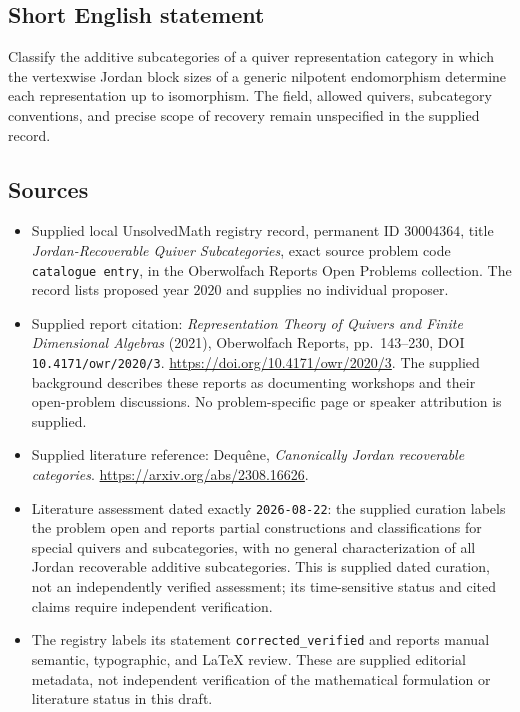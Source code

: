 \documentclass[11pt]{article}
\begin{document}
\subsection{Short English statement}
Classify the additive subcategories of a quiver representation category in which the vertexwise Jordan block sizes of a generic nilpotent endomorphism determine each representation up to isomorphism. The field, allowed quivers, subcategory conventions, and precise scope of recovery remain unspecified in the supplied record.
\subsection{Sources}
\begin{itemize}
\item Supplied local UnsolvedMath registry record, permanent ID \(30004364\), title \emph{Jordan-Recoverable Quiver Subcategories}, exact source problem code \texttt{catalogue entry}, in the Oberwolfach Reports Open Problems collection. The record lists proposed year \(2020\) and supplies no individual proposer.
\item Supplied report citation: \emph{Representation Theory of Quivers and Finite Dimensional Algebras} (2021), Oberwolfach Reports, pp.\ 143--230, DOI \texttt{10.4171/owr/2020/3}. \url{https://doi.org/10.4171/owr/2020/3}. The supplied background describes these reports as documenting workshops and their open-problem discussions. No problem-specific page or speaker attribution is supplied.
\item Supplied literature reference: Dequ\^ene, \emph{Canonically Jordan recoverable categories}. \url{https://arxiv.org/abs/2308.16626}.
\item Literature assessment dated exactly \texttt{2026-08-22}: the supplied curation labels the problem open and reports partial constructions and classifications for special quivers and subcategories, with no general characterization of all Jordan recoverable additive subcategories. This is supplied dated curation, not an independently verified assessment; its time-sensitive status and cited claims require independent verification.
\item The registry labels its statement \texttt{corrected\_verified} and reports manual semantic, typographic, and LaTeX review. These are supplied editorial metadata, not independent verification of the mathematical formulation or literature status in this draft.
\end{itemize}
\end{document}
